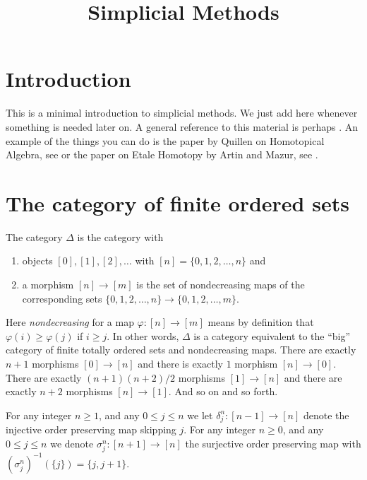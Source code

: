 

%


\title{Simplicial Methods}


\maketitle

\label{section-phantom}

\tableofcontents

\section{Introduction}
\label{section-introduction}

\noindent
This is a minimal introduction to simplicial methods.
We just add here whenever something is needed later on.
A general reference to this material is perhaps \cite{SimpHom}.
An example of the things you can do is the paper
by Quillen on Homotopical Algebra, see \cite{Quillen}
or the paper on Etale Homotopy by Artin and Mazur, see \cite{ArtinMazur}.

\section{The category of finite ordered sets}
\label{section-Delta}

\noindent
The category $\Delta$ is the category with
\begin{enumerate}
\item objects $[0], [1], [2], \ldots$ with
$[n] = \{0, 1, 2, \ldots, n\}$ and
\item a morphism $[n] \to [m]$ is the set of nondecreasing
maps of the corresponding
sets $\{0, 1, 2, \ldots, n\} \to \{0, 1, 2, \ldots, m\}$.
\end{enumerate}
Here {\it nondecreasing} for a map $\varphi : [n] \to [m]$
means by definition that $\varphi(i) \geq \varphi(j)$ if $i \geq j$.
In other words, $\Delta$ is a category equivalent to the
``big'' category of finite totally ordered sets and nondecreasing maps.
There are exactly $n + 1$ morphisms $[0] \to [n]$ and
there is exactly $1$ morphism $[n] \to [0]$. There are
exactly $(n + 1)(n + 2)/2$ morphisms $[1] \to [n]$ and there are
exactly $n + 2$ morphisms $[n] \to [1]$. And so on and so forth.

\begin{definition}
\label{definition-face-degeneracy}
For any integer $n\geq 1$, and any $0\leq j \leq n$ we let
{\it $\delta^n_j : [n-1] \to [n]$}
denote the injective order preserving map skipping $j$. For any
integer $n\geq 0$, and any $0\leq j \leq n$ we denote
{\it $\sigma^n_j : [n + 1]  \to [n]$}
the surjective order preserving map with
$(\sigma^n_j)^{-1}(\{j\}) = \{j, j + 1\}$.
\end{definition}

